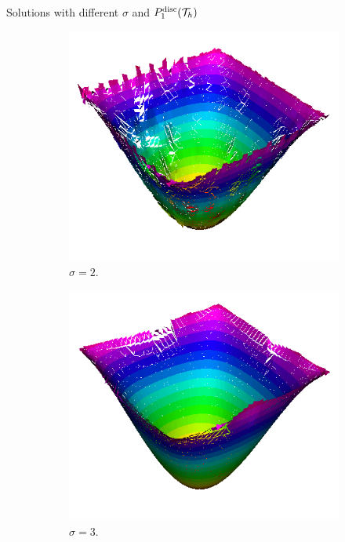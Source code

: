 \begin{frame}{Solutions with different $\sigma$ and $\relax{P}^{\text{disc}}_1(\mathcal{T}_h)$}
\begin{figure}[h!]
\begin{subfigure}[b]{0.27\textwidth}
				\includegraphics[scale=0.18]{img/Difusion/Recortes/steady_diffusion_approx_sigma_2.png}
				\caption{\scriptsize $\sigma=2$.}
			\end{subfigure}
			\begin{subfigure}[b]{0.27\textwidth}
				\centering
				\includegraphics[scale=0.18]{img/Difusion/Recortes/steady_diffusion_approx_sigma_3.png}
				\caption{\scriptsize $\sigma=3$.}
			\end{subfigure}
			\begin{subfigure}[b]{0.27\textwidth}
				\centering

\end{subfigure}
\end{figure}
\end{frame}
